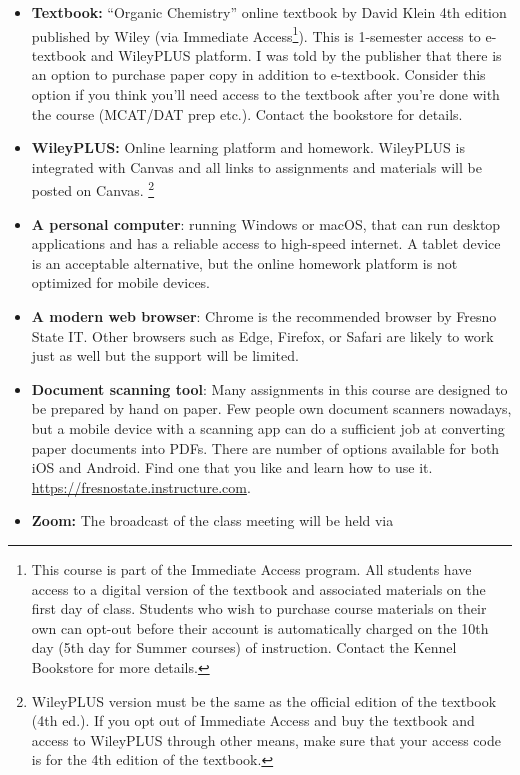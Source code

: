 \begin{itemize}
\tightlist
\item
  \textbf{Textbook:} ``Organic Chemistry'' online textbook by David
  Klein 4th edition published by Wiley (via Immediate
  Access\footnote{This course is part of the Immediate Access program.
    All students have access to a digital version of the textbook and
    associated materials on the first day of class. Students who wish to
    purchase course materials on their own can opt-out before their
    account is automatically charged on the 10th day (5th day for Summer
    courses) of instruction. Contact the Kennel Bookstore for more
    details.}). This is 1-semester access to e-textbook and WileyPLUS
  platform. I was told by the publisher that there is an option to
  purchase paper copy in addition to e-textbook. Consider this option if
  you think you'll need access to the textbook after you're done with
  the course (MCAT/DAT prep etc.). Contact the bookstore for details.
\item
  \textbf{WileyPLUS:} Online learning platform and homework. WileyPLUS
  is integrated with Canvas and all links to assignments and materials
  will be posted on Canvas. \footnote{WileyPLUS version must be the same
    as the official edition of the textbook (4th ed.). If you opt out of
    Immediate Access and buy the textbook and access to WileyPLUS
    through other means, make sure that your access code is for the 4th
    edition of the textbook.}
\item
  \textbf{A personal computer}: running Windows or macOS, that can run
  desktop applications and has a reliable access to high-speed internet.
  A tablet device is an acceptable alternative, but the online homework
  platform is not optimized for mobile devices.
\item
  \textbf{A modern web browser}: Chrome is the recommended browser by
  Fresno State IT. Other browsers such as Edge, Firefox, or Safari are
  likely to work just as well but the support will be limited.
\item
  \textbf{Document scanning tool}: Many assignments in this course are
  designed to be prepared by hand on paper. Few people own document
  scanners nowadays, but a mobile device with a scanning app can do a
  sufficient job at converting paper documents into PDFs. There are
  number of options available for both iOS and Android. Find one that
  you like and learn how to use it.
  \url{https://fresnostate.instructure.com}.
\item
  \textbf{Zoom:} The broadcast of the class meeting will be held via

\end{itemize}
